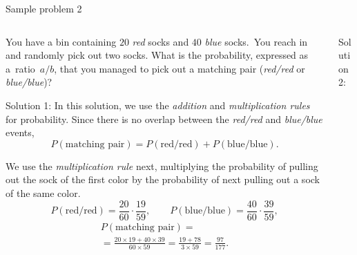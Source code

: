 \documentclass[9pt,aspectratio=169]{beamer}
\begin{document}
\begin{frame}{Sample problem 2}
  \begin{columns}[T]
    \begin{column}{0.5\textwidth}
      \begin{problem}
        You have a bin containing $20$ \emph{red} socks and $40$ \emph{blue} socks.~You reach in and randomly pick out two socks. What is the probability, expressed as a~ratio~$a/b$, that you managed to pick out a matching pair (\emph{red/red} or \emph{blue/blue})?
      \end{problem}
      {\color{textBlue} Solution 1:} In this solution, we use the \emph{addition} and \emph{multiplication rules} for probability. Since there is no overlap between the \emph{red/red} and \emph{blue/blue} events, 
      {\small
      \[ P(\text{matching pair}) = P(\text{red/red}) + P(\text{blue/blue}).\] \vspace*{-1ex}}

      We use the \emph{multiplication rule} next, multiplying the probability of pulling out the sock of the first color by the probability of next pulling out a sock of the same color.
      {\small
      \[
        P(\text{red/red}) = \frac{20}{60} \cdot \frac{19}{59}, \qquad
        P(\text{blue/blue}) = \frac{40}{60} \cdot \frac{39}{59},
      \]
      \vspace*{-1ex}
      \begin{multline*}
        P(\text{matching pair}) = \\ = \frac{20 \times 19 + 40 \times 39}{60 \times 59} = \frac{19 + 78}{3 \times 59} = \frac{97}{177}.
      \end{multline*}
      }
    \end{column}
    \begin{column}{0.5\textwidth}
      {\color{textBlue} Solution 2:} 


\end{column}
\end{columns}
\end{frame}
\end{document}
